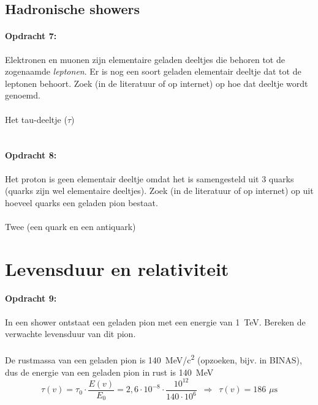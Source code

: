 \subsection{Hadronische showers}

\begin{minipage}[t]{1\columnwidth}
\paragraph{Opdracht 7:}
Elektronen en muonen zijn elementaire geladen deeltjes die behoren tot de zogenaamde \emph{leptonen}. Er is nog een soort geladen elementair deeltje dat tot de leptonen behoort. Zoek (in de literatuur of op internet) op hoe dat deeltje wordt genoemd.
\\ \\  
Het tau-deeltje ($\tau$)
\\ \\
\end{minipage}

\begin{minipage}[t]{1\columnwidth}
\paragraph{Opdracht 8:}
Het proton is geen elementair deeltje omdat het is samengesteld uit 3 quarks (quarks zijn wel elementaire deeltjes). Zoek (in de literatuur of op internet) op uit hoeveel quarks een geladen pion bestaat.  
\\ \\
Twee (een quark en een antiquark)
\end{minipage}
\smallskip{}

\section{Levensduur en relativiteit}

\begin{minipage}[t]{1\columnwidth}
\paragraph{Opdracht 9:}
In een shower ontstaat een geladen pion met een energie van \SI{1}{\tera\electronvolt}. Bereken de verwachte levensduur van dit pion.  
\\ \\
De rustmassa van een geladen pion is \SI{140}{\mega\electronvolt/c^2} (opzoeken, bijv. in BINAS), dus de energie van een geladen pion in rust is \SI{140}{\mega\electronvolt}
\begin{equation}
\tau (v) = \tau_0 \cdot \frac{E(v)}{E_0}=2,6 \cdot 10^{-8} \cdot \frac{10^{12}}{140 \cdot 10^6} \, \, \,  \Rightarrow \, \, \, \tau (v) = 186 \,\, \mu \textrm{s} \nonumber
\end{equation}
\end{minipage}
\smallskip{}

